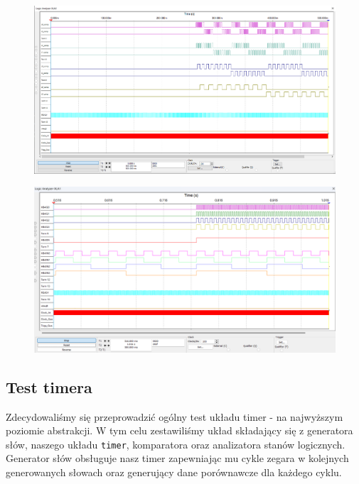 \documentclass[a4paper]{article}
\begin{document}
\begin{figure}[H]
    \centering
    \includegraphics[width=\textwidth]{component_test_logic_analyzer_xla3_setter.png}
\end{figure}

\begin{figure}[H]
    \centering
    \includegraphics[width=\textwidth]{component_test_logic_analyzer_xla1_setter.png}
\end{figure}

\pagebreak
\subsection{Test timera}
Zdecydowaliśmy się przeprowadzić ogólny test układu timer - na najwyższym poziomie abstrakcji.
W tym celu zestawiliśmy układ składający się z generatora słów, naszego układu \verb|timer|, komparatora oraz analizatora
stanów logicznych. Generator słów obsługuje nasz timer zapewniając mu cykle zegara w kolejnych 
generowanych słowach oraz generujący dane porównawcze dla każdego cyklu.
\end{document}

